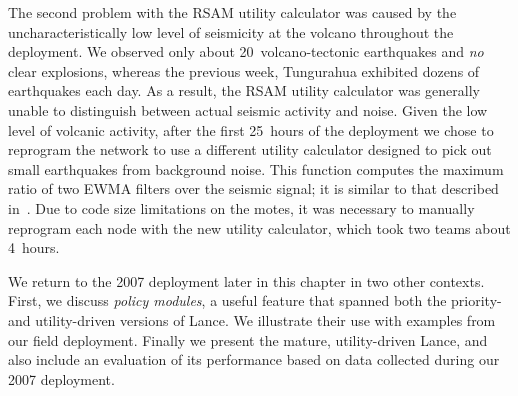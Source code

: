 The second problem with the RSAM utility calculator was caused by the
uncharacteristically low level of seismicity at the volcano throughout the
deployment. We observed only about 20~volcano-tectonic earthquakes and {\em
no} clear explosions, whereas the previous week, Tungurahua exhibited dozens
of earthquakes each day. As a result, the RSAM utility calculator was
generally unable to distinguish between actual seismic activity and noise.
Given the low level of volcanic activity, after the first 25~hours of the
deployment we chose to reprogram the network to use a different utility
calculator designed to pick out small earthquakes from background noise.  This
function computes the maximum ratio of two EWMA filters over the seismic
signal; it is similar to that described in~\cite{volcano-osdi06}. Due to code
size limitations on the motes, it was necessary to manually reprogram each
node with the new utility calculator, which took two teams about 4~hours.

We return to the 2007 deployment later in this chapter in two other contexts.
First, we discuss \textit{policy modules}, a useful feature that spanned both
the priority- and utility-driven versions of Lance.  We illustrate their use
with examples from our field deployment. Finally we present the mature,
utility-driven Lance, and also include an evaluation of its performance based
on data collected during our 2007 deployment.
